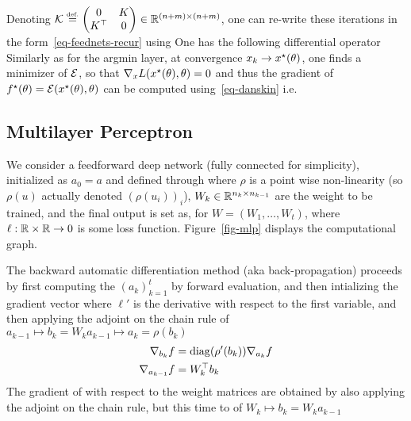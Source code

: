 Denoting  $\mathcal{K} \stackrel{\mbox{\upshape\tiny def.}}{=} \begin{pmatrix} 0 & K \\ K^\top & 0 \end{pmatrix} \in \mathbb{R}^{(n+m) \times (n+m)}$, one can re-write these iterations in the form~\eqref{eq-feednets-recur} using 
One has the following differential operator 
Similarly as for the argmin layer, at convergence $x_k \rightarrow x^\star(\theta)$, one finds a minimizer of $\mathcal{E}$, so that $\nabla_x L(x^\star(\theta),\theta)=0$ and thus the gradient of $f^\star(\theta)=\mathcal{E}(x^\star(\theta),\theta)$ can be computed using~\eqref{eq-danskin} i.e.



\subsection{Multilayer Perceptron}
\label{sec-autodiff-mlp}


We consider a feedforward deep network (fully connected for simplicity), initialized as $a_0=a$ and defined through 
where $\rho$ is a point wise non-linearity (so $\rho(u)$ actually denoted $(\rho(u_i))_i$), $W_k \in \mathbb{R}^{n_k \times n_{k-1}}$ are the weight to be trained, and the final output is set as, for $W=(W_1,\ldots,W_t)$, 
where $\ell : \mathbb{R} \times \mathbb{R} \rightarrow 0$ is some loss function. Figure~\ref{fig-mlp} displays the computational graph.

The backward automatic differentiation method (aka back-propagation) proceeds by first computing the $(a_k)_{k=1}^t$ by forward evaluation, and then intializing the gradient vector
where $\ell'$ is the derivative with respect to the first variable, and then applying the adjoint on the chain rule of $a_{k-1} \mapsto b_k  = W_k a_{k-1}\mapsto a_k = \rho(b_k)$
\begin{align*}
	\nabla_{b_{k}} f &= \operatorname{diag}(\rho'(b_k)) \nabla_{a_k} f \\
	\nabla_{a_{k-1}} f &= W_k^\top b_{k}
\end{align*}
The gradient of with respect to the weight matrices are obtained by also applying the adjoint on the chain rule, but this time to of $W_k \mapsto b_k  = W_k a_{k-1}$
\fi 



